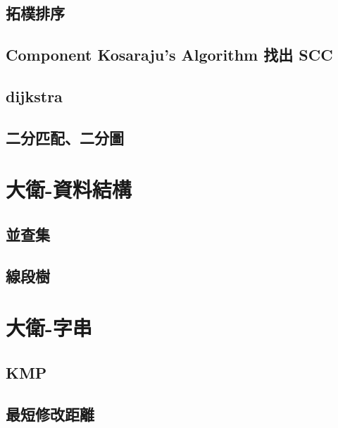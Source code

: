 \subsection{拓樸排序}
\raggedbottom
\hrulefill
\subsection{Component Kosaraju's Algorithm 找出 SCC}
\raggedbottom
\hrulefill
\subsection{dijkstra}
\raggedbottom
\hrulefill
\subsection{二分匹配、二分圖}
\raggedbottom
\hrulefill

\section{大衛-資料結構}
\subsection{並查集}
\raggedbottom
\hrulefill
\subsection{線段樹}
\raggedbottom
\hrulefill

\section{大衛-字串}
\subsection{KMP}
\raggedbottom
\hrulefill
\subsection{最短修改距離}
\raggedbottom
\hrulefill

